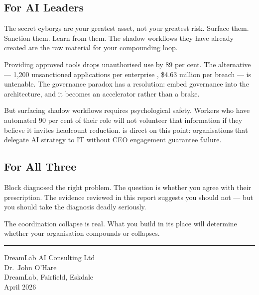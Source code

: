\subsection{For AI Leaders}

The secret cyborgs are your greatest asset, not your greatest risk. Surface them. Sanction them. Learn from them. The shadow workflows they have already created are the raw material for your compounding loop.

Providing approved tools drops unauthorised use by 89 per cent. The alternative --- 1,200 unsanctioned applications per enterprise \parencite{Gartner2025}, \$4.63 million per breach \parencite{IBM2025} --- is untenable. The governance paradox has a resolution: embed governance into the architecture, and it becomes an accelerator rather than a brake.

But surfacing shadow workflows requires psychological safety. Workers who have automated 90 per cent of their role will not volunteer that information if they believe it invites headcount reduction. \textcite{Mollick2025Management} is direct on this point: organisations that delegate AI strategy to IT without CEO engagement guarantee failure.

\subsection{For All Three}

Block diagnosed the right problem. The question is whether you agree with their prescription. The evidence reviewed in this report suggests you should not --- but you should take the diagnosis deadly seriously.

The coordination collapse is real. What you build in its place will determine whether your organisation compounds or collapses.

\vspace{2cm}

\begin{center}
\textcolor{accentgold}{\rule{0.4\textwidth}{1pt}}

\vspace{0.5cm}

{\small\textcolor{navyblue!70!black}{DreamLab AI Consulting Ltd\\
Dr.\ John O'Hare\\
DreamLab, Fairfield, Eskdale\\
April 2026}}
\end{center}
